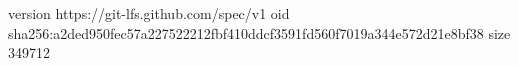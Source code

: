 version https://git-lfs.github.com/spec/v1
oid sha256:a2ded950fec57a227522212fbf410ddcf3591fd560f7019a344e572d21e8bf38
size 349712
